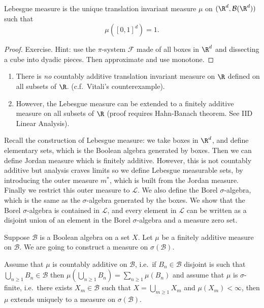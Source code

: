 \documentclass[a4paper]{article}
\begin{document}
\begin{proposition}
  Lebesgue measure is the unique translation invariant measure \(\mu\) on \((\R^d, \mathcal B(\R^d))\) such that
  \[
    \mu([0, 1]^d) = 1.
  \]
\end{proposition}

\begin{proof}
  Exercise. Hint: use the \(\pi\)-system \(\mathcal F\) made of all boxes in \(\R^d\) and dissecting a cube into dyadic pieces. Then approximate and use monotone.
\end{proof}

\begin{remark}\leavevmode
  \begin{enumerate}
  \item There is \emph{no} countably additive translation invariant measure on \(\R\) defined on all subsets of \(\R\). (c.f.\ Vitali's counterexample).
  \item However, the Lebesgue measure can be extended to a finitely additive measure on all subsets of \(\R\) (proof requires Hahn-Banach theorem. See IID Linear Analysis).
  \end{enumerate}
\end{remark}

Recall the construction of Lebesgue measure: we take boxes in \(\R^d\), and define elementary sets, which is the Boolean algebra generated by boxes. Then we can define Jordan measure which is finitely additive. However, this is not countably additive but analysis craves limits so we define Lebesgue measurable sets, by introducing the outer measure \(m^*\), which is built from the Jordan measure. Finally we restrict this outer measure to \(\mathcal L\). We also define the Borel \(\sigma\)-algebra, which is the same as the \(\sigma\)-algebra generated by the boxes. We show that the Borel \(\sigma\)-algebra is contained in \(\mathcal L\), and every element in \(\mathcal L\) can be written as a disjoint union of an element in the Borel \(\sigma\)-algebra and a measure zero set.

Suppose \(\mathcal B\) is a Boolean algebra on a set \(X\). Let \(\mu\) be a finitely additive measure on \(\mathcal B\). We are going to construct a measure on \(\sigma(\mathcal B)\).

\begin{theorem}
  Assume that \(\mu\) is countably additive on \(\mathcal B\), i.e.\ if \(B_n \in \mathcal B\) disjoint is such that \(\bigcup_{n \geq 1} B_n \in \mathcal B\) then \(\mu(\bigcup_{n \geq 1} B_n) = \sum_{n \geq 1} \mu(B_n)\) and assume that \(\mu\) is \(\sigma\)-finite, i.e.\ there exists \(X_m \in \mathcal B\) such that \(X = \bigcup_{m \geq 1} X_m\) and \(\mu(X_m) < \infty\), then \(\mu\) extends uniquely to a measure on \(\sigma(\mathcal B)\).
\end{theorem}
\end{document}
